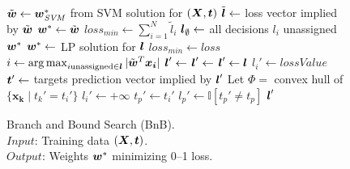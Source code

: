 \begin{figure}[t!]
\vspace{-3mm}
\caption{
Branch and Bound Search (BnB).\hfill\; \\
\text{\hspace{1.4cm}} $Input$: Training data $(\boldsymbol{X},\boldsymbol{t})$. \\
\text{\hspace{1.4cm}} $Output$: Weights $\boldsymbol{w}^*$ minimizing 0--1 loss.
}
\label{alg:BnB.Final}
{\footnotesize
\begin{algorithmic}[1]
\State $\tilde{\boldsymbol{w}} \gets \boldsymbol{w}^*_{\mathit{SVM}}$ from SVM solution for $(\boldsymbol{X},\boldsymbol{t})$
\State $\tilde{\boldsymbol{l}} \gets $ loss vector implied by $\tilde{\boldsymbol{w}}$
\State $\boldsymbol{w}^* \gets \tilde{\boldsymbol{w}}$
\State $loss_{min} \gets \sum_{i=1}^N \tilde{l}_i$ 
\State $\boldsymbol{l}_\emptyset \gets $ all decisions $l_i$ unassigned
\State {}
\State \Return $\boldsymbol{w}^*$
\Statex
{}
      \State $\boldsymbol{w}^* \gets$ LP solution for $\boldsymbol{l}$ 
      \State $loss_{min} \gets loss$
   \Else
      \State $i \gets \argmax_{i \text{unassigned} \in \l} |\tilde{\w}^T\boldsymbol{x_i}|$
      \State $\boldsymbol{l}' \gets$ 
         \State {}
      \EndIf
      \State $\boldsymbol{l}' \gets$ 
         \State {}
      \EndIf
   \EndIf
\EndProcedure
\Statex
{} 
   \State $\boldsymbol{l}' \gets \boldsymbol{l}$
   \State $l_i' \gets lossValue$   
   \State $\boldsymbol{t}' \gets $ targets prediction vector implied by $\boldsymbol{l}'$ 
   \State Let $\Phi =$ convex hull of $\{ \boldsymbol{x_k} \; | \; t_k'=t_i' \}$ 
      \State $l_i' \gets +\infty$ 
   \Else
         \State $t_p' \gets t_i'$ 
         \State $l_p' \gets \mathbb{I} [t_p' \not= t_p]$
      \EndIf
   \EndFor
   \EndIf  
   \State \Return $\boldsymbol{l}'$ 
\EndFunction
\Statex
\EndFunction
\end{algorithmic}}
\vspace{-4mm}
\end{figure}

